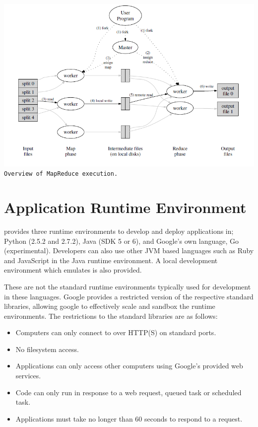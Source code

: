 \begin{center}
\includegraphics[scale=0.4]{figs/MapReduce.png} \\
\texttt{Overview of MapReduce execution.}~\cite{MapReduce}
\end{center}

\section{Application Runtime Environment}
\gae{} provides three runtime environments to develop and deploy applications in; Python (2.5.2 and 2.7.2), Java (SDK 5 or 6), and Google's own language, Go (experimental). Developers can also use other JVM based languages such as Ruby and JavaScript in the Java runtime environment. A local development environment which emulates \gae{} is also provided. 

These are not the standard runtime environments typically used for development in these languages. Google provides a restricted version of the respective standard libraries, allowing google to effectively scale and sandbox the runtime environments. The restrictions to the standard libraries are as follows\ftGAETwo:\ftGAETwoText
\begin{itemize}
\item Computers can only connect to \gae{} over HTTP(S) on standard ports.
\item No filesystem access.
\item Applications can only access other computers using Google's provided web services.
\item Code can only run in response to a web request, queued task or scheduled task. 
\item Applications must take no longer than 60 seconds to respond to a request.
\end{itemize}

